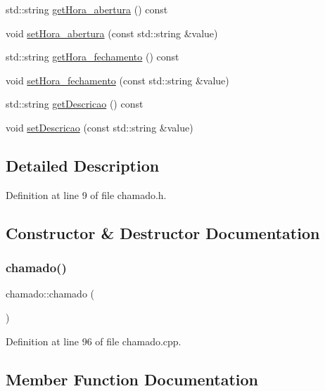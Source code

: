 \begin{DoxyCompactItemize}
\item 
std\+::string \hyperlink{classchamado_ac3e3786e54b646f1c3757944b3721052}{get\+Hora\+\_\+abertura} () const
\item 
void \hyperlink{classchamado_a46f5d88d083e43aef547d2883647ee5a}{set\+Hora\+\_\+abertura} (const std\+::string \&value)
\item 
std\+::string \hyperlink{classchamado_ad59c464a0e3afa7625c228dce0d7881b}{get\+Hora\+\_\+fechamento} () const
\item 
void \hyperlink{classchamado_a197bb7f1316be766cd8bd015a653961c}{set\+Hora\+\_\+fechamento} (const std\+::string \&value)
\item 
std\+::string \hyperlink{classchamado_afb4074cc898db415c87bcc5850fb46d9}{get\+Descricao} () const
\item 
void \hyperlink{classchamado_a237f1aa14c584876728add1fe13adc61}{set\+Descricao} (const std\+::string \&value)
\end{DoxyCompactItemize}


\subsection{Detailed Description}


Definition at line 9 of file chamado.\+h.



\subsection{Constructor \& Destructor Documentation}
\hypertarget{classchamado_a6a80bec45db77367311bf035b22ba4ec}{}\label{classchamado_a6a80bec45db77367311bf035b22ba4ec} 
\subsubsection{\texorpdfstring{chamado()}{chamado()}}
{\footnotesize\ttfamily chamado\+::chamado (\begin{DoxyParamCaption}{ }\end{DoxyParamCaption})}



Definition at line 96 of file chamado.\+cpp.



\subsection{Member Function Documentation}
\hypertarget{classchamado_afb4074cc898db415c87bcc5850fb46d9}{}\label{classchamado_afb4074cc898db415c87bcc5850fb46d9} 
